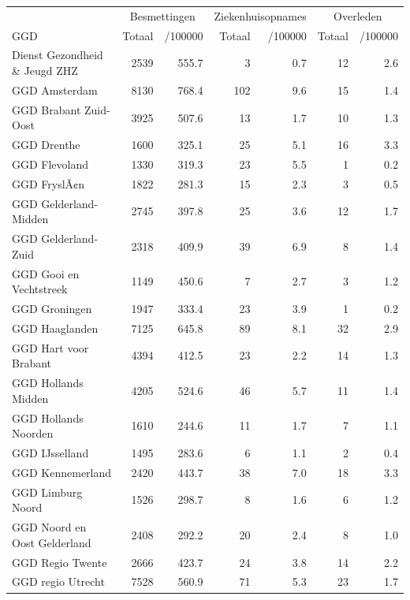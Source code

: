 \documentclass[
  english,
  man,floatsintext]{apa6}
\begin{document}
\begin{table}[H]
\centering\begingroup\fontsize{10}{12}\selectfont

\begin{threeparttable}
\begin{tabular}{lrrrrrr}
\toprule
\multicolumn{1}{c}{ } & \multicolumn{2}{c}{Besmettingen} & \multicolumn{2}{c}{Ziekenhuisopnames} & \multicolumn{2}{c}{Overleden} \\
\cmidrule(l{3pt}r{3pt}){2-3} \cmidrule(l{3pt}r{3pt}){4-5} \cmidrule(l{3pt}r{3pt}){6-7}
GGD & Totaal & /100000 & Totaal & /100000 & Totaal & /100000\\
\midrule
Dienst Gezondheid \& Jeugd ZHZ & 2539 & 555.7 & 3 & 0.7 & 12 & 2.6\\
GGD Amsterdam & 8130 & 768.4 & 102 & 9.6 & 15 & 1.4\\
GGD Brabant Zuid-Oost & 3925 & 507.6 & 13 & 1.7 & 10 & 1.3\\
GGD Drenthe & 1600 & 325.1 & 25 & 5.1 & 16 & 3.3\\
GGD Flevoland & 1330 & 319.3 & 23 & 5.5 & 1 & 0.2\\
GGD FryslÃ¢n & 1822 & 281.3 & 15 & 2.3 & 3 & 0.5\\
GGD Gelderland-Midden & 2745 & 397.8 & 25 & 3.6 & 12 & 1.7\\
GGD Gelderland-Zuid & 2318 & 409.9 & 39 & 6.9 & 8 & 1.4\\
GGD Gooi en Vechtstreek & 1149 & 450.6 & 7 & 2.7 & 3 & 1.2\\
GGD Groningen & 1947 & 333.4 & 23 & 3.9 & 1 & 0.2\\
GGD Haaglanden & 7125 & 645.8 & 89 & 8.1 & 32 & 2.9\\
GGD Hart voor Brabant & 4394 & 412.5 & 23 & 2.2 & 14 & 1.3\\
GGD Hollands Midden & 4205 & 524.6 & 46 & 5.7 & 11 & 1.4\\
GGD Hollands Noorden & 1610 & 244.6 & 11 & 1.7 & 7 & 1.1\\
GGD IJsselland & 1495 & 283.6 & 6 & 1.1 & 2 & 0.4\\
GGD Kennemerland & 2420 & 443.7 & 38 & 7.0 & 18 & 3.3\\
GGD Limburg Noord & 1526 & 298.7 & 8 & 1.6 & 6 & 1.2\\
GGD Noord en Oost Gelderland & 2408 & 292.2 & 20 & 2.4 & 8 & 1.0\\
GGD Regio Twente & 2666 & 423.7 & 24 & 3.8 & 14 & 2.2\\
GGD regio Utrecht & 7528 & 560.9 & 71 & 5.3 & 23 & 1.7\\

\end{tabular}
\end{threeparttable}
\end{table}
\end{document}
